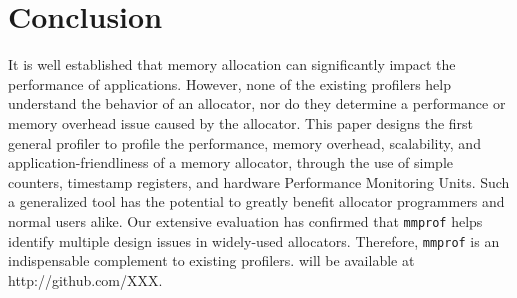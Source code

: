 \section{Conclusion}
\label{sec:conclusion}

It is well established that memory allocation can significantly impact the performance of applications. However, none of the existing profilers help understand the behavior of an allocator, nor do they determine a performance or memory overhead issue caused by the allocator. This paper designs the first general profiler to profile the performance, memory overhead, scalability, and application-friendliness of a memory allocator, through the use of simple counters, timestamp registers, and hardware Performance Monitoring Units. Such a generalized tool has the potential to greatly benefit allocator programmers and normal users alike. Our extensive evaluation has confirmed that \texttt{mmprof} helps identify multiple design issues in widely-used allocators. Therefore, \texttt{mmprof} is an indispensable complement to existing profilers. \MP{} will be available at http://github.com/XXX. 